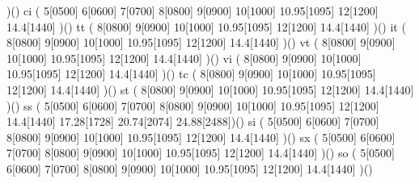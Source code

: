                           )()
     \makefont\fonttwoletters ci    %
                        ( 5[0500] 6[0600] 7[0700] 8[0800] 9[0900]
                          10[1000] 10.95[1095] 12[1200] 14.4[1440]
                          )()
     \makefont\fonttwoletters tt   %
                        (%
                          8[0800] 9[0900]
                          10[1000] 10.95[1095] 12[1200] 14.4[1440]
                          )()
     \makefont\fonttwoletters it   %
                        (%
                          8[0800] 9[0900]
                          10[1000] 10.95[1095] 12[1200] 14.4[1440]
                          )()
     \makefont\fonttwoletters vt   %
                        (%
                          8[0800] 9[0900]
                          10[1000] 10.95[1095] 12[1200] 14.4[1440]
                          )()
     \makefont\fonttwoletters vi   %
                        (%
                          8[0800] 9[0900]
                          10[1000] 10.95[1095] 12[1200] 14.4[1440]
                          )()
     \makefont\fonttwoletters tc   %
                        (%
                          8[0800] 9[0900]
                          10[1000] 10.95[1095] 12[1200] 14.4[1440]
                          )()
     \makefont\fonttwoletters st   %
                        (%
                          8[0800] 9[0900]
                          10[1000] 10.95[1095] 12[1200] 14.4[1440]
                          )()
     \makefont\fonttwoletters ss   %
                        ( 5[0500] 6[0600] 7[0700] 8[0800] 9[0900]
                          10[1000] 10.95[1095] 12[1200] 14.4[1440]
                          17.28[1728] 20.74[2074] 24.88[2488])()
     \makefont\fonttwoletters si   %
                        ( 5[0500] 6[0600] 7[0700] 8[0800] 9[0900]
                          10[1000] 10.95[1095] 12[1200] 14.4[1440]
                          )()
     \makefont\fonttwoletters sx   %
                        ( 5[0500] 6[0600] 7[0700] 8[0800] 9[0900]
                          10[1000] 10.95[1095] 12[1200] 14.4[1440]
                          )()
     \makefont\fonttwoletters so   %
                        ( 5[0500] 6[0600] 7[0700] 8[0800] 9[0900]
                          10[1000] 10.95[1095] 12[1200] 14.4[1440]
                          )()
